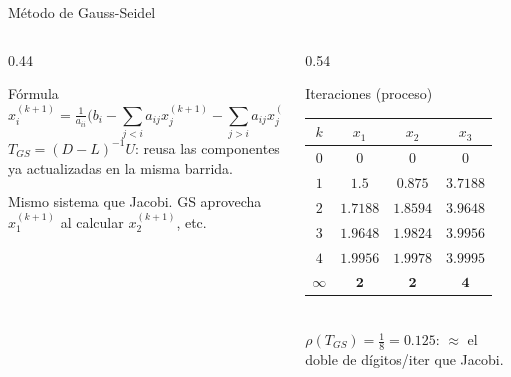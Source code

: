 \documentclass[aspectratio=169,10pt]{beamer}
\begin{document}
\begin{frame}{Método de Gauss-Seidel}
\begin{columns}[T]
\begin{column}{0.44\textwidth}
\begin{cardidea}{Fórmula}{\faSuperscript}
{\scriptsize$$x_i^{(k+1)}=\tfrac{1}{a_{ii}}\Big(b_i-\!\!\sum_{j<i}\!a_{ij}x_j^{(k+1)}-\!\!\sum_{j>i}\!a_{ij}x_j^{(k)}\Big)$$}
{\footnotesize $T_{GS}=(D{-}L)^{-1}U$: reusa las componentes ya actualizadas en la misma barrida.}
\end{cardidea}
\vspace{1mm}
\begin{cardnota}[\faInfoCircle]
{\footnotesize Mismo sistema que Jacobi. GS aprovecha $x_1^{(k+1)}$ al calcular $x_2^{(k+1)}$, etc.}
\end{cardnota}
\end{column}
\begin{column}{0.54\textwidth}
\begin{cardgear}{Iteraciones (proceso)}{\faTable}
\centering
{\footnotesize\renewcommand{\arraystretch}{1.2}\setlength{\tabcolsep}{3pt}
\begin{tabular}{c|ccc}
$k$ & $x_1$ & $x_2$ & $x_3$\\\hline
$0$&$0$&$0$&$0$\\ $1$&$1.5$&$0.875$&$3.7188$\\ $2$&$1.7188$&$1.8594$&$3.9648$\\ $3$&$1.9648$&$1.9824$&$3.9956$\\ $4$&$1.9956$&$1.9978$&$3.9995$\\ $\infty$&$\mathbf 2$&$\mathbf 2$&$\mathbf 4$\\
\end{tabular}}\\[1mm]
{\footnotesize $\rho(T_{GS})=\tfrac18=0.125$: $\approx$ el doble de dígitos/iter que Jacobi.}
\end{cardgear}
\end{column}
\end{columns}
\end{frame}
\end{document}
